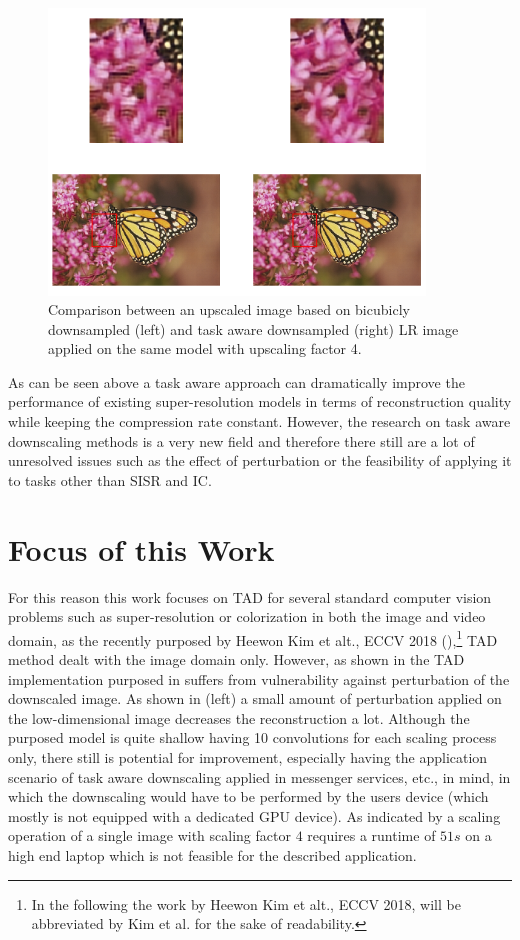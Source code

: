 \begin{figure}[!htbp]
\centering
\includegraphics[width=10cm]{figures/shrb_vs_shrt_x4}
\caption{Comparison between an upscaled image based on bicubicly downsampled
(left) and task aware downsampled (right) LR image applied on the same model
with upscaling factor 4.}
\label{fig:shrb_vs_shrt_x4}
\end{figure}

As can be seen above a task aware approach can dramatically improve the performance of existing super-resolution models in terms of reconstruction
quality while keeping the compression rate constant. However, the research on task aware downscaling methods is a very new field and therefore there still are a lot of unresolved issues such as the effect of perturbation or the feasibility of applying it to tasks other than \ac{SISR} and \ac{IC}.

\section{Focus of this Work}
For this reason this work focuses on \ac{TAD} for several standard
computer vision problems such as super-resolution or colorization in both the image and video domain, as the recently purposed by Heewon Kim et alt., ECCV 2018 (\cite{TAID}),\footnote{In the following the work by Heewon Kim et alt., ECCV 2018, will be abbreviated by Kim et al. for the sake of readability. } \ac{TAD} method dealt with the image domain only. However, as shown in  the \ac{TAD} implementation purposed in \cite{TAID} suffers from vulnerability against perturbation of the downscaled image. As shown in (left) a small amount of perturbation applied on the low-dimensional image decreases the reconstruction a lot. Although the purposed model is quite shallow having 10 convolutions for each scaling process only, there still is potential for improvement, especially having the application scenario of task aware downscaling applied in messenger services, etc., in mind, in which the downscaling would have to be performed by the users device (which mostly is not equipped with a dedicated GPU device). As indicated by  a scaling operation of a single image with scaling factor $4$ requires a runtime of $51s$ on a high end laptop which is not feasible for the described application. 

